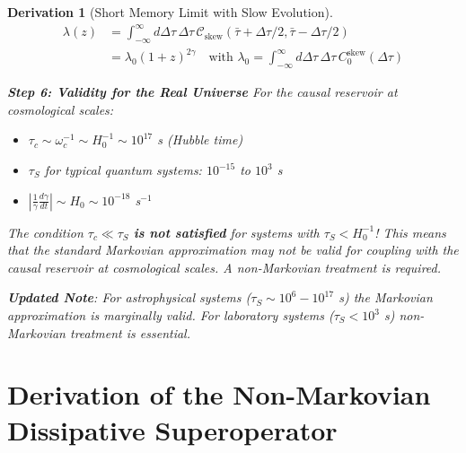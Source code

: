 \documentclass[10pt, a4paper]{article}
\newtheorem{derivation}{Derivation}
\begin{document}
\begin{derivation}[Short Memory Limit with Slow Evolution]
\begin{align}
\lambda(z) &= \int_{-\infty}^{\infty} d\Delta\tau \, \Delta\tau \, \mathcal{C}_{\text{skew}}(\bar{\tau}+\Delta\tau/2, \bar{\tau}-\Delta\tau/2) \\
&= \lambda_0 (1+z)^{2\gamma} \quad \text{with } \lambda_0 = \int_{-\infty}^{\infty} d\Delta\tau \, \Delta\tau \, C_0^{\text{skew}}(\Delta\tau)
\tag{24.8}
\end{align}

\textbf{Step 6: Validity for the Real Universe}
For the causal reservoir at cosmological scales:
\begin{itemize}
\item $\tau_c \sim \omega_c^{-1} \sim H_0^{-1} \sim 10^{17}$ s (Hubble time)
\item $\tau_S$ for typical quantum systems: $10^{-15}$ to $10^3$ s
\item $\left|\frac{1}{\gamma}\frac{d\gamma}{dt}\right| \sim H_0 \sim 10^{-18}$ s$^{-1}$
\end{itemize}
The condition $\tau_c \ll \tau_S$ \textbf{is not satisfied} for systems with $\tau_S < H_0^{-1}$! This means that the standard Markovian approximation may not be valid for coupling with the causal reservoir at cosmological scales. A non-Markovian treatment is required.

\textbf{Updated Note}: For astrophysical systems ($\tau_S \sim 10^{6}-10^{17}$ s) the Markovian approximation is marginally valid. For laboratory systems ($\tau_S < 10^3$ s) non-Markovian treatment is essential.
\end{derivation}

\section{Derivation of the Non-Markovian Dissipative Superoperator}
\end{document}

